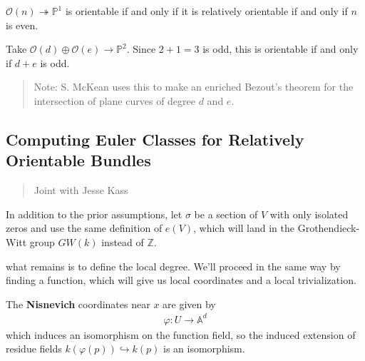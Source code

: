 \begin{example}[?]

\(\mathcal O(n) \twoheadrightarrow{\mathbb{P}}^1\) is orientable if and
only if it is relatively orientable if and only if \(n\) is even.

\end{example}

\begin{example}[?]

Take \({\mathcal{O}}(d)\oplus {\mathcal{O}}(e) \to {\mathbb{P}}^2\).
Since \(2+1=3\) is odd, this is orientable if and only if \(d+e\) is
odd.

\end{example}

\begin{quote}
Note: S. McKean uses this to make an enriched Bezout's theorem for the
intersection of plane curves of degree \(d\) and \(e\).
\end{quote}

\hypertarget{computing-euler-classes-for-relatively-orientable-bundles}{%
\subsection{Computing Euler Classes for Relatively Orientable
Bundles}\label{computing-euler-classes-for-relatively-orientable-bundles}}

\begin{quote}
Joint with Jesse Kass
\end{quote}

In addition to the prior assumptions, let \(\sigma\) be a section of
\(V\) with only isolated zeros and use the same definition of \(e(V)\),
which will land in the Grothendieck-Witt group \(GW(k)\) instead of
\({\mathbb{Z}}\).

what remains is to define the local degree. We'll proceed in the same
way by finding a function, which will give us local coordinates and a
local trivialization.

\begin{definition}

The \textbf{Nisnevich} coordinates near \(x\) are given by
\begin{align*}
\varphi: U \to {\mathbb{A}}^d
\end{align*}
which induces an isomorphism on the function field, so the induced
extension of residue fields \(k(\varphi(p)) \hookrightarrow k(p)\) is an
isomorphism.

\end{definition}

